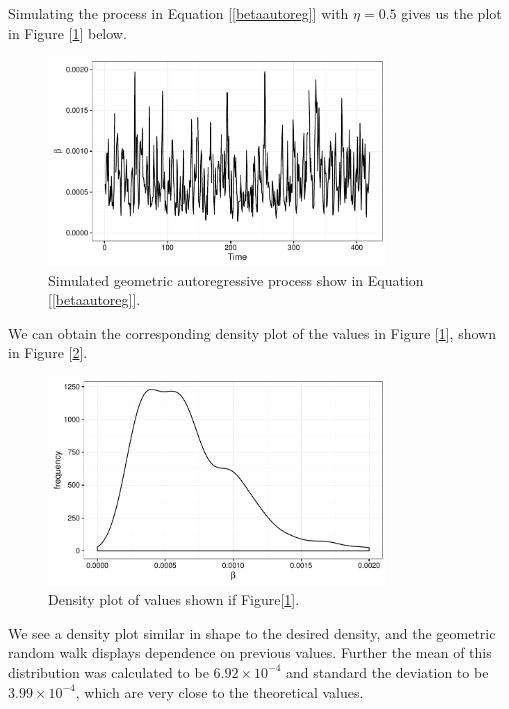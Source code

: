 	Simulating the process in Equation [\ref{betaautoreg}] with $\eta = 0.5$ gives us the plot in Figure [\ref{betaplot}] below.

	\begin{figure}
        \centering
        \captionsetup{width=.8\linewidth}
        \includegraphics[width=0.8\textwidth]{./images/betaplot.pdf}
        \caption{Simulated geometric autoregressive process show in Equation [\ref{betaautoreg}]. \label{betaplot}}
    \end{figure}

    We can obtain the corresponding density plot of the values in Figure [\ref{betaplot}], shown in Figure [\ref{betadensity}].

    \begin{figure}
        \centering
        \captionsetup{width=.8\linewidth}
        \includegraphics[width=0.8\textwidth]{./images/betadensity.pdf}
        \caption{Density plot of values shown if Figure[\ref{betaplot}]. \label{betadensity}}
    \end{figure}

    We see a density plot similar in shape to the desired density, and the geometric random walk displays dependence on previous values. Further the mean of this distribution was calculated to be $6.92 \times 10^{-4}$ and standard the deviation to be $3.99 \times 10^{-4}$, which are very close to the theoretical values.

